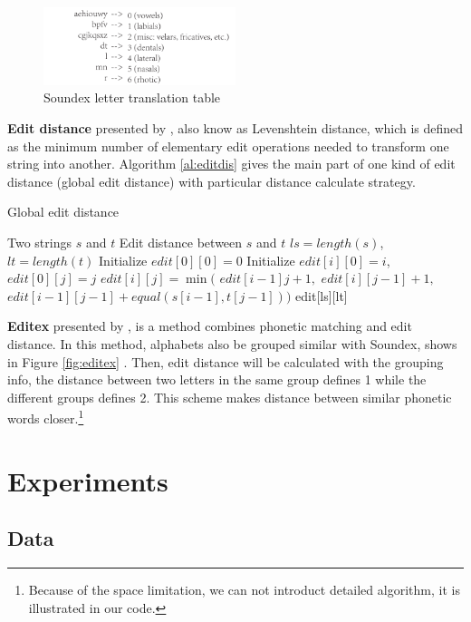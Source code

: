 \documentclass[11pt]{article}
\begin{document}
\begin{figure}
	\centering
	\includegraphics[width=0.5\textwidth]{img/soundex.pdf}
	\caption{Soundex letter translation table}
	\label{fig:soundex}
\end{figure}

\noindent\textbf{Edit distance} presented by \cite{Levenshtein1965Binary},  also know as Levenshtein distance, which is defined as the minimum number of elementary edit operations needed to transform one string into another. Algorithm \ref{al:editdis} gives the main part of one kind of edit distance (global edit distance) with particular distance calculate strategy.

\begin{algorithm}[htb]
	\caption{Global edit distance}
	\label{al:editdis}
	\begin{algorithmic}[1]
		\REQUIRE Two strings $s$ and $t$
		\ENSURE Edit distance between $s$ and $t$
		\STATE $ls = length(s)$, $lt = length(t)$
		\STATE Initialize $edit[0][0]=0$
		\STATE Initialize $edit[i][0]=i$, $edit[0][j]=j$
		\STATE $edit[i][j] = \min($
		\STATE $edit[i-1]j+1, $
		\STATE $edit[i][j-1]+1, $
		\STATE $edit[i-1][j-1]+equal(s[i-1],t[j-1]))$
		\ENDFOR
		\ENDFOR
		\RETURN edit[ls][lt]
	\end{algorithmic}
\end{algorithm}


\noindent\textbf{Editex} presented by \cite{Zobel1996PhoneticSM}, is a method combines phonetic matching and edit distance. In this method, alphabets also be grouped similar with Soundex, shows in Figure \ref{fig:editex} . Then, edit distance will be calculated with the grouping info, the distance between two letters in the same group defines 1 while the different groups defines 2. This scheme makes distance between similar phonetic words closer.\footnote{Because of the space limitation, we can not introduct detailed algorithm, it is illustrated in our code.}

\section{Experiments}

\subsection{Data} 
\end{document}
